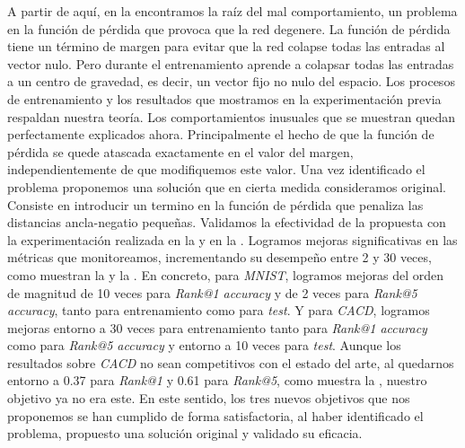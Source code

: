 A partir de aquí, en la  encontramos la raíz del mal comportamiento, un problema en la función de pérdida que provoca que la red degenere. La función de pérdida tiene un término de margen para evitar que la red colapse todas las entradas al vector nulo. Pero durante el entrenamiento aprende a colapsar todas las entradas a un centro de gravedad, es decir, un vector fijo no nulo del espacio. Los procesos de entrenamiento y los resultados que mostramos en la experimentación previa respaldan nuestra teoría. Los comportamientos inusuales que se muestran quedan perfectamente explicados ahora. Principalmente el hecho de que la función de pérdida se quede atascada exactamente en el valor del margen, independientemente de que modifiquemos este valor. Una vez identificado el problema proponemos una solución que en cierta medida consideramos original. Consiste en introducir un termino en la función de pérdida que penaliza las distancias ancla-negatio pequeñas. Validamos la efectividad de la propuesta con la experimentación realizada en la  y en la . Logramos mejoras significativas en las métricas que monitoreamos, incrementando su desempeño entre 2 y 30 veces, como muestran la  y la . En concreto, para \textit{MNIST}, logramos mejoras del orden de magnitud de 10 veces para \textit{Rank@1 accuracy} y de 2 veces para \textit{Rank@5 accuracy}, tanto para entrenamiento como para \textit{test}. Y para \textit{CACD}, logramos mejoras entorno a 30 veces para entrenamiento tanto para \textit{Rank@1 accuracy} como para \textit{Rank@5 accuracy} y entorno a 10 veces para \textit{test}. Aunque los resultados sobre \textit{CACD} no sean competitivos con el estado del arte, al quedarnos entorno a 0.37 para \textit{Rank@1} y 0.61 para \textit{Rank@5}, como muestra la , nuestro objetivo ya no era este. En este sentido, los tres nuevos objetivos que nos proponemos se han cumplido de forma satisfactoria, al haber identificado el problema, propuesto una solución original y validado su eficacia.

